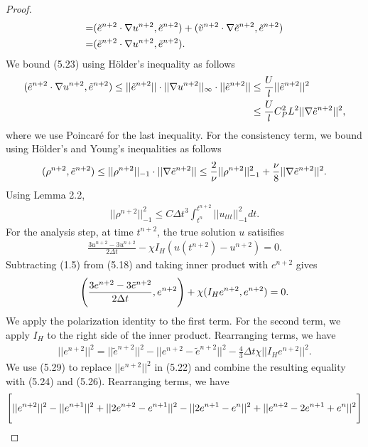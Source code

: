 \documentclass[11pt,a4paper]{article}
\begin{document}
\begin{proof}
\begin{align}
        =&(\tilde{e}^{n+2}\cdot \nabla u^{n+2}, \Tilde{e}^{n+2})+(\tilde{v}^{n+2}\cdot \nabla \Tilde{e}^{n+2}, \Tilde{e}^{n+2}) \notag \\
        =&(\tilde{e}^{n+2}\cdot \nabla u^{n+2}, \Tilde{e}^{n+2}).    \end{align}
    We bound (5.23) using H\"{o}lder's inequality as follows
    \begin{align}
        (\tilde{e}^{n+2}\cdot \nabla u^{n+2}, \Tilde{e}^{n+2}) 
        \leq ||\tilde{e}^{n+2}||\cdot ||\nabla u^{n+2}||_\infty \cdot ||\Tilde{e}^{n+2}|| &\leq \frac{U}{l}||\tilde{e}^{n+2}||^2 \notag \\
        &\leq \frac{U}{l}C_P^2L^2 ||\nabla \tilde{e}^{n+2}||^2,
    \end{align}
    where we use Poincar\'e for the last inequality. For the consistency term, we bound using H\"{o}lder's and Young's inequalities as follows
    \begin{align}
        (\rho^{n+2}, \Tilde{e}^{n+2})\leq ||\rho^{n+2}||_{-1} \cdot ||\nabla \Tilde{e}^{n+2}||\leq \frac{2}{\nu}||\rho^{n+2}||_{-1}^2+\frac{\nu}{8}||\nabla \Tilde{e}^{n+2}||^2.
    \end{align}
    Using Lemma 2.2, 
    \begin{align}
        ||\rho^{n+2}||_{-1}^2\leq C\Delta t^3\int_{t^n}^{t^{n+2}}||u_{ttt}||_{-1}^2dt.
    \end{align}
    For the analysis step, at time $t^{n+2}$, the true solution $u$ satisifies
    \begin{align}
        \frac{3u^{n+2}-3u^{n+2}}{2\Delta t}-\chi I_H(u(t^{n+2})-u^{n+2})=0.
    \end{align}
    Subtracting (1.5) from (5.18) and taking inner product with $e^{n+2}$ gives
    \begin{align}
        \Bigg(\frac{3e^{n+2}-3\Tilde{e}^{n+2}}{2\Delta t}, e^{n+2}\Bigg)+\chi (I_He^{n+2},e^{n+2})=0.
    \end{align}
    We apply the polarization identity to the first term. For the second term, we apply $I_H$ to the right side of the inner product. Rearranging terms, we have 
    \begin{align}
        ||e^{n+2}||^2=||\tilde{e}^{n+2}||^2-||e^{n+2}-\tilde{e}^{n+2}||^2-\frac{4}{3}\Delta t\chi ||I_He^{n+2}||^2.
    \end{align}
    We use (5.29) to replace $||e^{n+2}||^2$ in (5.22) and combine the resulting equality with (5.24) and (5.26). Rearranging terms, we have
    \begin{align}
        &\Bigg[||e^{n+2}||^2-||e^{n+1}||^2+||2e^{n+2}-e^{n+1}||^2-||2e^{n+1}-e^n||^2+||e^{n+2}-2e^{n+1}+e^n||^2\Bigg] \notag  \\

\end{align}
\end{proof}
\end{document}
